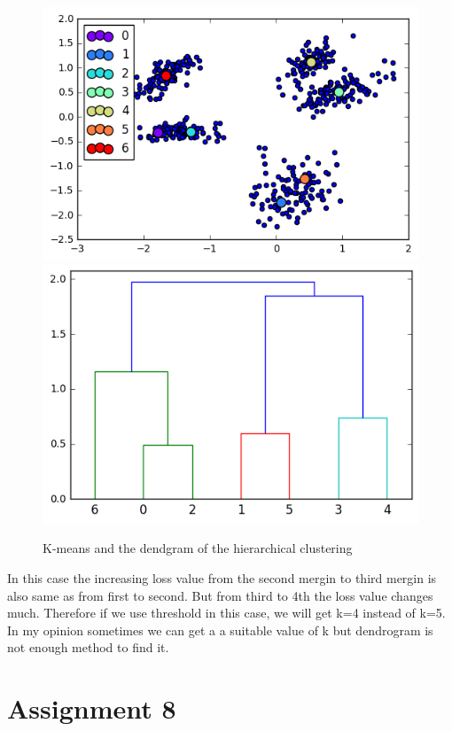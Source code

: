\documentclass[a4paper,11pt]{article}
\begin{document}
\begin{figure}[htbp]
  \includegraphics[scale=0.5]{kmfordend2.png}
  \includegraphics[scale=0.5]{dendg2.png}
  \caption{K-means and the dendgram of the hierarchical clustering}
\end{figure}

In this case the increasing loss value from the second mergin to third mergin is also same as from first to second. But from third to 4th the loss value changes much. Therefore if we use threshold in this case, we will get k=4 instead of k=5.
In my opinion sometimes we can get a a suitable value of k but dendrogram is not enough method to find it.

\section*{Assignment 8}
\end{document}
